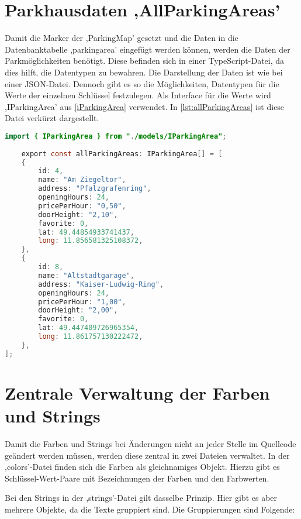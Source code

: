 \section{Parkhausdaten ,AllParkingAreas'}
\label{AllParkingAreas}
Damit die Marker der ,ParkingMap' gesetzt und die Daten in die Datenbanktabelle ,parkingarea' eingefügt werden können, werden die Daten der Parkmöglichkeiten benötigt. Diese befinden sich in einer TypeScript-Datei, da dies hilft, die Datentypen zu bewahren. Die Darstellung der Daten ist wie bei einer JSON-Datei. Dennoch gibt es so die Möglichkeiten, Datentypen für die Werte der einzelnen Schlüssel festzulegen. Als Interface für die Werte wird ,IParkingArea' aus \autoref{iParkingArea} verwendet. In \autoref{lst:allParkingAreas} ist diese Datei verkürzt dargestellt. 

\begin{lstlisting}[caption={Die verkürzte Darstellung der Datei, welche die Daten der Parkmöglichkeiten beinhaltet. Wäre Typensicherheit egal, könnten die Daten auch in eine JSON-Datei geschrieben werden. (Quelle: Eigene Implementierung)},captionpos=b, language=Java, label=lst:allParkingAreas]
	import { IParkingArea } from "./models/IParkingArea";
	
	export const allParkingAreas: IParkingArea[] = [
	{
		id: 4,
		name: "Am Ziegeltor",
		address: "Pfalzgrafenring",
		openingHours: 24,
		pricePerHour: "0,50",
		doorHeight: "2,10",
		favorite: 0,
		lat: 49.44854933741437,
		long: 11.856581325108372,
	},
	{
		id: 8,
		name: "Altstadtgarage",
		address: "Kaiser-Ludwig-Ring",
		openingHours: 24,
		pricePerHour: "1,00",
		doorHeight: "2,00",
		favorite: 0,
		lat: 49.447409726965354,
		long: 11.861757130222472,
	},
];	
\end{lstlisting}

\section{Zentrale Verwaltung der Farben und Strings}
Damit die Farben und Strings bei Änderungen nicht an jeder Stelle im Quellcode geändert werden müssen, werden diese zentral in zwei Dateien verwaltet. In der ,colors'-Datei finden sich die Farben als gleichnamiges Objekt. Hierzu gibt es Schlüssel-Wert-Paare mit Bezeichnungen der Farben und den Farbwerten. 

Bei den Strings in der ,strings'-Datei gilt dasselbe Prinzip. Hier gibt es aber mehrere Objekte, da die Texte gruppiert sind. Die Gruppierungen sind Folgende:

